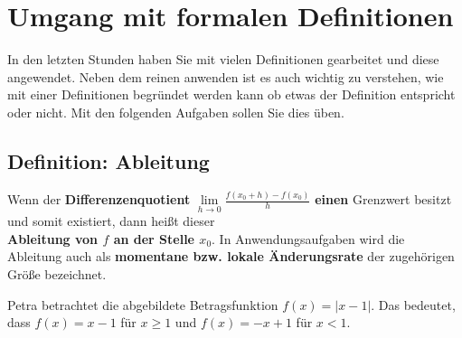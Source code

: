
\vspace{-0.3cm}
	\section*{Umgang mit formalen Definitionen}
		In den letzten Stunden haben Sie mit vielen Definitionen gearbeitet und diese angewendet. Neben dem reinen anwenden ist es auch wichtig zu verstehen, wie mit einer Definitionen begründet werden kann ob etwas der Definition entspricht oder nicht. Mit den folgenden Aufgaben sollen Sie dies üben.\vspace{-0.3cm}
		\subsection*{Definition: Ableitung}
			\begin{tcolorbox}
				Wenn der \textbf{Differenzenquotient} $\lim\limits_{h\rightarrow0}{\frac{f(x_0+h)-f(x_0)}{h}}$ \textbf{einen} Grenzwert besitzt und somit existiert, dann heißt dieser\\
				
				\textbf{	Ableitung von $f$ an der Stelle $x_0$}.
				\tcblower
				In Anwendungsaufgaben wird die Ableitung auch als\textbf{ momentane bzw. lokale Änderungsrate} der zugehörigen Größe bezeichnet. 
			\end{tcolorbox}
			Petra betrachtet die abgebildete Betragsfunktion $f(x)=\left\vert x-1\right\vert$. Das bedeutet, dass $f(x)=x-1$ für $x\geq 1$ und $f(x)=-x+1$ für $x<1$. \\
			
